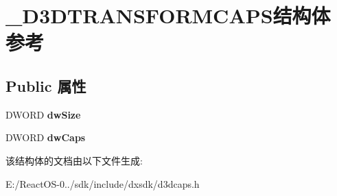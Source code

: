\hypertarget{struct___d3_d_t_r_a_n_s_f_o_r_m_c_a_p_s}{}\section{\+\_\+\+D3\+D\+T\+R\+A\+N\+S\+F\+O\+R\+M\+C\+A\+P\+S结构体 参考}
\label{struct___d3_d_t_r_a_n_s_f_o_r_m_c_a_p_s}
\subsection*{Public 属性}
\begin{DoxyCompactItemize}
\item 
\mbox{\label{struct___d3_d_t_r_a_n_s_f_o_r_m_c_a_p_s_a7c60f9a4af8c946d02407a3e52a0a568}} 
D\+W\+O\+RD {\bfseries dw\+Size}
\item 
\mbox{\label{struct___d3_d_t_r_a_n_s_f_o_r_m_c_a_p_s_a3261b2b397bcd2e20bfcfc2252bbb9f9}} 
D\+W\+O\+RD {\bfseries dw\+Caps}
\end{DoxyCompactItemize}


该结构体的文档由以下文件生成\+:\begin{DoxyCompactItemize}
\item 
E\+:/\+React\+O\+S-\/0../sdk/include/dxsdk/d3dcaps.\+h\end{DoxyCompactItemize}
